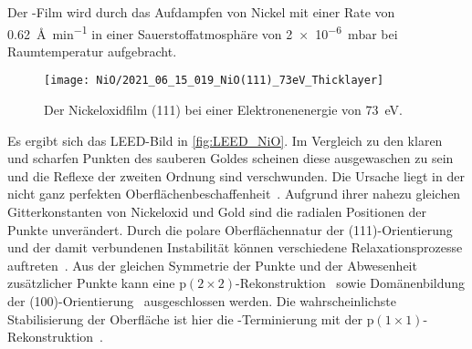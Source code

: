         Der -Film wird durch das Aufdampfen von Nickel mit einer Rate von \SI{0.62}{\angstrom\per\minute} in einer Sauerstoffatmosphäre von \SI{2e-6}{\milli\bar} bei Raumtemperatur aufgebracht.
        \begin{figure}
            \centering
            \texttt{[image: NiO/2021\_06\_15\_019\_NiO(111)\_73eV\_Thicklayer]}
            \caption{Der Nickeloxidfilm (111) bei einer Elektronenenergie von \SI{73}{\electronvolt}.}
            \label{fig:LEED_NiO}
        \end{figure}
        Es ergibt sich das LEED-Bild in \autoref{fig:LEED_NiO}.
        Im Vergleich zu den klaren und scharfen Punkten des sauberen Goldes scheinen diese ausgewaschen zu sein und die Reflexe der zweiten Ordnung sind verschwunden.
        Die Ursache liegt in der nicht ganz perfekten Oberflächenbeschaffenheit~\cite{NiO_34}.
        Aufgrund ihrer nahezu gleichen Gitterkonstanten von Nickeloxid und Gold sind die radialen Positionen der Punkte unverändert.
        Durch die polare Oberflächennatur der (111)-Orientierung und der damit verbundenen Instabilität können verschiedene Relaxationsprozesse auftreten~\cite{NiO_36, NiO_35, NiO_34, NiO_27, NiO_10}.
        Aus der gleichen Symmetrie der Punkte und der Abwesenheit zusätzlicher Punkte kann eine $\text{p}(2 \times 2)$-Rekonstruktion~\cite{NiO_37} sowie Domänenbildung der (100)-Orientierung~\cite{NiO_36} ausgeschlossen werden.
        Die wahrscheinlichste Stabilisierung der Oberfläche ist hier die -Terminierung mit der $\text{p}(1 \times 1)$-Rekonstruktion~\cite{NiO_35}.

